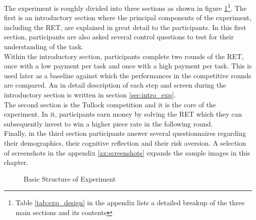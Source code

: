     
    The experiment is roughly divided into three sections as shown in figure \ref{fig:exp_str}\footnote{ Table \ref{tab:exp_design} in the appendix lists a detailed breakup of the three main sections and its contents}. The first is an introductory section where the principal components of the experiment, including the RET, are explained in great detail to the participants. In this first section, participants are also asked several control questions to test for their understanding of the task.\\
    
    Within the introductory section, participants complete two rounds of the RET, once with a low payment per task and once with a high payment per task. This is used later as a baseline against which the performances in the competitive rounds are compared. An in detail description of each step and screen during the introductory section is written in section \ref{sec:intro_exp}.\\
    
    The second section is the Tullock competition and it is the core of the experiment. In it, participants earn money by solving the RET which they can subsequently invest to win a higher piece rate in the following round.\\
    
    Finally, in the third section participants answer several questionnaires regarding their demographics, their cognitive reflection and their risk aversion.  A selection of screenshots in the appendix \ref{ax:screenshots} expands the sample images in this chapter.\\
    
    \begin{figure}
\centering
{}

\caption{Basic Structure of Experiment}
\label{fig:exp_str}
\end{figure}
    
